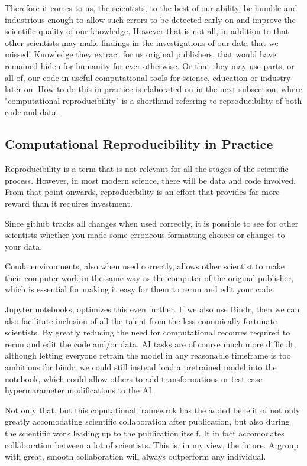 \documentclass[nofootinbib,UKenglish,nobalancelastpage,12pt]{article}
\begin{document}
Therefore it comes to us, the scientists, to the best of our ability, be humble and industrious enough to allow such errors to be detected early on and improve the scientific quality of our knowledge. However that is not all, in addition to that other scientists may make findings in the investigations of our data that we missed! Knowledge they extract for us original publishers, that would have remained hiden for humanity for ever otherwise. Or that they may use parts, or all of, our code in useful computational tools for science, education or industry later on. How to do this in practice is elaborated on in the next subsection, where "computational reproducibility" is a shorthand referring to reproducibility of both code and data.

\subsection{Computational Reproducibility in Practice}

Reproducibility is a term that is not relevant for all the stages of the scientific process. However, in most modern science, there will be data and code involved. From that point onwards, reproducibility is an effort that provides far more reward than it requires investment. 

Since github tracks all changes when used correctly, it is possible to see for other scientists whether you made some erroneous formatting choices or changes to your data. 

Conda environments, also when used correctly, allows other scientist to make their computer work in the same way as the computer of the original publisher, which is essential for making it easy for them to rerun and edit your code.

Jupyter notebooks, optimizes this even further. If we also use Bindr, then we can also facilitate inclusion of all the talent from the less eonomically fortunate scientists. By greatly reducing the need for computational recoures required to rerun and edit the code and/or data. AI tasks are of course much more difficult, although letting everyone retrain the model in any reasonable timeframe is too ambitious for bindr, we could still instead load a pretrained model into the notebook, which could allow others to add transformations or test-case hypermarameter modifications to the AI.

Not only that, but this coputational framewrok has the added benefit of not only greatly accomodating scientific collaboration after publication, but also during the scientific work leading up to the publication itself. It in fact accomodates collaboration between a lot of scientists. This is, in my view, the future. A group with great, smooth collaboration will always outperform any individual.
\end{document}
